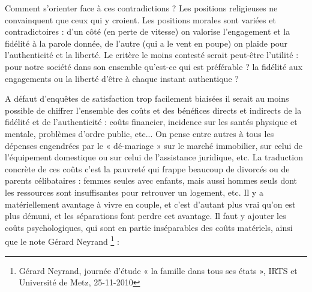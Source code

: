  Comment s'orienter face à ces contradictions ? Les positions religieuses ne convainquent que ceux qui y croient. Les positions morales sont variées et contradictoires : d'un côté (en perte de vitesse) on valorise l'engagement et la fidélité à la parole donnée, de l'autre (qui a le vent en poupe) on plaide pour l'authenticité et la liberté. Le critère le moins contesté serait peut-être l'utilité : pour notre société dans son ensemble qu'est-ce qui est préférable ? la fidélité aux engagements ou la liberté d'être à chaque instant authentique ?  

 A défaut d'enquêtes de satisfaction trop facilement biaisées il serait au moins possible de chiffrer l'ensemble des coûts et des bénéfices directs et indirects de la fidélité et de l'authenticité  : coûts financier, incidence sur les santés physique et mentale, problèmes d'ordre public, etc... On pense entre autres à tous les dépenses engendrées par le « dé-mariage » sur le marché immobilier, sur celui de l'équipement domestique ou sur celui de l'assistance juridique, etc. La traduction concrète de ces coûts c'est la pauvreté qui frappe beaucoup de divorcés ou de parents célibataires : femmes seules avec enfants, mais aussi hommes seuls dont les ressources sont insuffisantes pour retrouver un logement, etc. Il y a matériellement avantage à vivre en couple, et c'est d'autant plus vrai qu'on est plus démuni, et les séparations font perdre cet avantage. Il faut y ajouter les coûts psychologiques, qui sont en partie inséparables des coûts matériels, ainsi que le note Gérard Neyrand \footnote{Gérard Neyrand, journée d'étude « la famille dans tous ses états », IRTS et Université de Metz, 25-11-2010} :  
